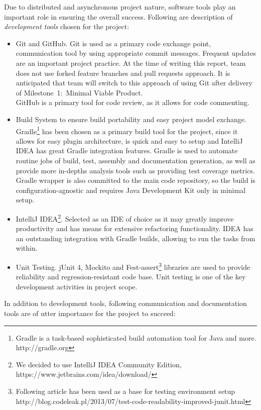 Due to distributed and asynchronous project nature, software tools play an important role in ensuring the overall success. Following are description of \emph{development tools} chosen for the project:

\begin{itemize}
	\item Git and GitHub. Git is used as a primary code exchange point, communication tool by using appropriate commit messages. Frequent updates are an
	important project practice. At the time of writing this report, team does not use forked feature branches and pull requests approach. It is anticipated that team will
	switch to this approach of using Git after delivery of Milestone~1:~Minimal Viable Product. \\GitHub is a primary tool for code review, as it allows for
	code commenting.
	\item Build System to ensure build portability and easy project model exchange.
	 Gradle\footnote{Gradle is a task-based sophisticated build automation tool for Java and more. http://gradle.org} has been chosen as a primary build tool for the project, since it allows for easy plugin architecture, is quick and easy to setup and IntelliJ IDEA has
	 great Gradle integration features. Gradle is used to automate routine jobs of build, test, assembly  and documentation generation,
	as well as provide more in-depths analysis tools such as providing test coverage metrics.\\Gradle wrapper is also committed to the main code repository, so the build
	is configuration-agnostic and requires Java Development Kit only in minimal setup.
	\item IntelliJ IDEA\footnote{We decided to use IntelliJ IDEA Community Edition, https://www.jetbrains.com/idea/download/}. Selected as an IDE of choice as it may greatly improve productivity and has means for extensive refactoring functionality. IDEA has an outstanding
	integration with Gradle builds, allowing to run the tasks from within.
	\item Unit Testing. jUnit 4, Mockito and Fest-assert\footnote{Following article has been used as a base for testing environment setup http://blog.codeleak.pl/2013/07/test-code-readability-improved-junit.html} libraries are used to provide reliability and regression-resistant code base. Unit testing is one of the key development
	activities in project scope.
\end{itemize}

In addition to development tools, following communication and documentation tools are of utter importance for the project to succeed:

